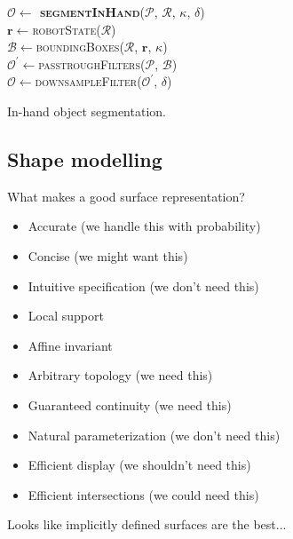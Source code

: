 \begin{algorithm}[h]
    \textbf{$\mathcal{O} \leftarrow$ \textsc{segmentInHand}}($\mathcal{P}$, $\mathcal{R}$, $\kappa$, $\delta$)\\ %
\LinesNumbered
\DontPrintSemicolon
\SetAlgoVlined {} 
  $\mathbf{r} \leftarrow$\textsc{robotState}($\mathcal{R}$) \\
  $\mathcal{B} \leftarrow$\textsc{boundingBoxes}($\mathcal{R}$, $\mathbf{r}$, $\kappa$) \\
  $\mathcal{O^\prime} \leftarrow$\textsc{passtroughFilters}($\mathcal{P}$, $\mathcal{B}$) \\
  $\mathcal{O} \leftarrow$\textsc{downsampleFilter}($\mathcal{O^\prime}$, $\delta$) \\
\caption{In-hand object segmentation.} \label{alg:in-hand-segmentation}
\end{algorithm}


\subsection{Shape modelling}
\label{sec:shape}
What makes a good surface representation?
\begin{itemize}
\item Accurate (we handle this with probability)
\item Concise (we might want this)
\item Intuitive specification (we don't need this)
\item Local support
\item Affine invariant 
\item Arbitrary topology (we need this)
\item Guaranteed continuity (we need this)
\item Natural parameterization (we don't need this)
\item Efficient display (we shouldn't need this)
\item Efficient intersections (we could need this)
\end{itemize}

Looks like implicitly defined surfaces are the best...


